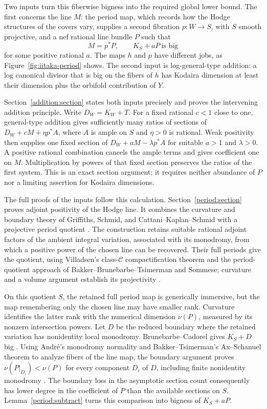 Two inputs turn this fiberwise bigness into the required global
lower bound. The first concerns the line $M$: the period map,
which records how the Hodge structures of the covers vary, supplies
a second fibration $p:W\to S$, with $S$ smooth projective, and
a nef rational line bundle $P$ such that
\[
                      M=p^*P,\qquad K_S+aP\ \text{is big}
\]
for some positive rational $a$. The maps $h$ and $p$ have different
jobs, as Figure~\ref{fig:iitaka-period} shows. The second input is
log-general-type addition: a log canonical divisor that is big on
the fibers of $h$ has Kodaira dimension at least their dimension
plus the orbifold contribution of $Y$.



Section~\ref{addition:section} states both inputs precisely and proves the intervening
addition principle. Write $D_W=K_W+T$. For a fixed rational $c<1$
close to one, general-type addition gives sufficiently many ratios
of sections of $D_W+cM+\eta p^*A$, where $A$ is ample on $S$
and $\eta>0$ is rational. Weak positivity then supplies one fixed
section of $D_W+aM-\lambda p^*A$ for suitable $a>1$ and
$\lambda>0$. A positive rational combination cancels the ample
terms and gives coefficient one on $M$. Multiplication by powers
of that fixed section preserves the ratios of the first system.
This is an exact section argument; it requires neither abundance
of $P$ nor a limiting assertion for Kodaira dimensions.

The full proofs of the inputs follow this calculation.
Section~\ref{period:section} proves adjoint positivity of the Hodge line. It combines
the curvature and boundary theory of Griffiths, Schmid, and
Cattani--Kaplan--Schmid with a projective period quotient
\cite{GriffithsPeriodsIII,Schmid,CKS}.
The construction retains suitable rational adjoint factors of the
ambient integral variation, associated with its monodromy, from which
a positive power of the chosen line can be recovered. Their full
periods give the quotient, using Villadsen's class-$\mathcal C$
compactification theorem and the period-quotient approach of
Bakker--Brunebarbe--Tsimerman and Sommese; curvature and a volume
argument establish its projectivity
\cite{BakkerBrunebarbeTsimerman,SommesePeriodMapping,VilladsenHodgeKahler}.

On this quotient $S$, the retained full period map is generically
immersive, but the map remembering only the chosen line may have
smaller rank. Curvature identifies the latter rank with the numerical
dimension $\nu(P)$, measured by its nonzero intersection powers.
Let $D$ be the reduced boundary where the retained variation has
nonidentity local monodromy. Brunebarbe--Cadorel gives $K_S+D$ big
\cite{BrunebarbeCadorel}. Using Andr\'e's monodromy normality and
Bakker--Tsimerman's Ax--Schanuel theorem to analyze fibers of the
line map, the boundary argument proves
$\nu(P|_{D_i})<\nu(P)$ for every component $D_i$ of $D$, including
finite nonidentity monodromy
\cite{AndreMonodromy,BakkerTsimermanAxSchanuel}.
The boundary loss in the asymptotic section count consequently has
lower degree in the coefficient of $P$ than the available sections
on $S$. Lemma~\ref{period:subtract} turns this comparison into
bigness of $K_S+aP$.


